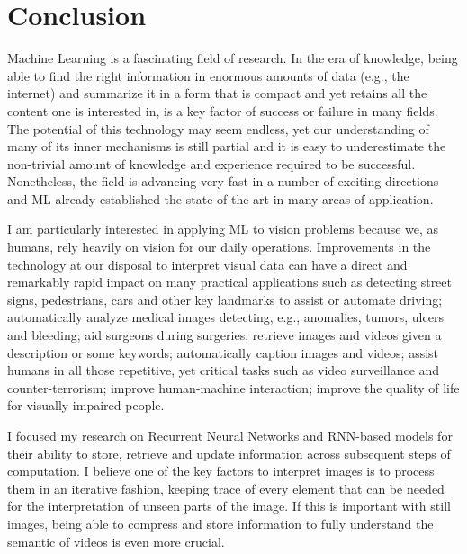 \chapter{Conclusion}\label{sec:conclusion}

Machine Learning is a fascinating field of research. In the era of knowledge,
being able to find the right information in enormous amounts of data (e.g., the
internet) and summarize it in a form that is compact and yet retains all the
content one is interested in, is a key factor of success or failure in many
fields. The potential of this technology may seem endless, yet our
understanding of many of its inner mechanisms is still partial and it is easy
to underestimate the non-trivial amount of knowledge and experience required to
be successful.  Nonetheless, the field is advancing very fast in a number of
exciting directions and ML already established the state-of-the-art in many
areas of application.

I am particularly interested in applying ML to vision problems because we, as
humans, rely heavily on vision for our daily operations. Improvements in the
technology at our disposal to interpret visual data can have a direct and
remarkably rapid impact on many practical applications such as detecting
street signs, pedestrians, cars and other key landmarks to assist or automate
driving; automatically analyze medical images detecting, e.g., anomalies,
tumors, ulcers and bleeding; aid surgeons during surgeries; retrieve images and
videos given a description or some keywords; automatically caption images and
videos; assist humans in all those repetitive, yet critical tasks such as video
surveillance and counter-terrorism; improve human-machine interaction; improve
the quality of life for visually impaired people.

I focused my research on Recurrent Neural Networks and RNN-based models for
their ability to store, retrieve and update information across subsequent steps
of computation. I believe one of the key factors to interpret images is to
process them in an iterative fashion, keeping trace of every element that can
be needed for the interpretation of unseen parts of the image. If this is
important with still images, being able to compress and store information to
fully understand the semantic of videos is even more crucial.

